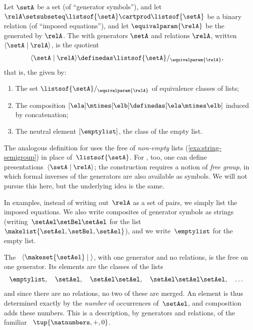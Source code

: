 \begin{ctdefinition}
    \label{def:presented-monoid}
    Let $\setA$ be a set (of ``generator symbols''), and let $\relA \setsubseteq \listsof{\setA} \cartprod \listsof{\setA}$ be a binary relation (of ``imposed equations''), and let $\equivalparam{\relA}$ be the  generated by $\relA$.
    The  with generators $\setA$ and relations $\relA$, written $\langle \setA \mid \relA \rangle$, is the quotient 
    \begin{equation}
        \langle \setA \mid \relA \rangle \definedas \listsof{\setA} /_{\equivalparam{\relA}},
    \end{equation}
    that is, the  given by:

    \constit
    \begin{enumerate}
        \item The set $\listsof{\setA} /_{\equivalparam{\relA}}$ of equivalence classes of lists;
        \item The composition $[\ela] \mtimes [\elb] \definedas [\ela \mtimes \elb]$ induced by concatenation;
        \item The neutral element $[\emptylist]$, the class of the empty list.
    \end{enumerate}
\end{ctdefinition}

\begin{remark}
    The analogous definition for  uses the free  of \emph{non-empty} lists (\cref{exa:string-semigroup}) in place of~$\listsof{\setA}$.
    For , too, one can define presentations~$\langle \setA \mid \relA \rangle$; the construction requires a notion of \emph{free group}, in which formal inverses of the generators are also available as symbols.
    We will not pursue this here, but the underlying idea is the same.
\end{remark}

In examples, instead of writing out~$\relA$ as a set of pairs, we simply list the imposed equations.
We also write composites of generator symbols as strings (writing~$\setAel\setBel\setAel$ for the list~$\makelist{\setAel, \setBel, \setAel}$), and we write~$\emptylist$ for the empty list.

\begin{example}
    \label{exa:presentation-free-one-gen}
    The ~$\langle \makeset{\setAel} \mid \; \rangle$, with one generator and no relations, is the free  on one generator.
    Its elements are the classes of the lists
    \begin{equation}
        \emptylist, \quad \setAel, \quad \setAel\setAel, \quad \setAel\setAel\setAel, \quad \dots
    \end{equation}
    and since there are no relations, no two of these are merged.
    An element is thus determined exactly by the \emph{number} of occurrences of~$\setAel$, and composition adds these numbers.
    This is a description, by generators and relations, of the familiar ~$\tup{\natnumbers, +, 0}$.
\end{example}

